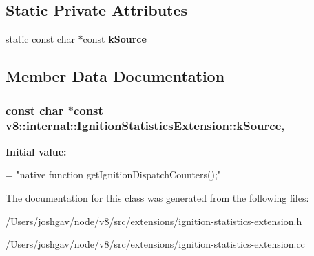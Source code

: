 \subsection*{Static Private Attributes}
\begin{DoxyCompactItemize}
\item 
static const char $\ast$const {\bfseries k\+Source}
\end{DoxyCompactItemize}


\subsection{Member Data Documentation}
\subsubsection[{\texorpdfstring{k\+Source}{kSource}}]{\setlength{\rightskip}{0pt plus 5cm}const char $\ast$const v8\+::internal\+::\+Ignition\+Statistics\+Extension\+::k\+Source\hspace{0.3cm}{\ttfamily [static]}, {\ttfamily [private]}}\hypertarget{classv8_1_1internal_1_1_ignition_statistics_extension_a52b1bfd61449594b8d6aebe535e1efc5}{}\label{classv8_1_1internal_1_1_ignition_statistics_extension_a52b1bfd61449594b8d6aebe535e1efc5}
{\bfseries Initial value\+:}
\begin{DoxyCode}
=
    \textcolor{stringliteral}{"native function getIgnitionDispatchCounters();"}
\end{DoxyCode}


The documentation for this class was generated from the following files\+:\begin{DoxyCompactItemize}
\item 
/\+Users/joshgav/node/v8/src/extensions/ignition-\/statistics-\/extension.\+h\item 
/\+Users/joshgav/node/v8/src/extensions/ignition-\/statistics-\/extension.\+cc\end{DoxyCompactItemize}
